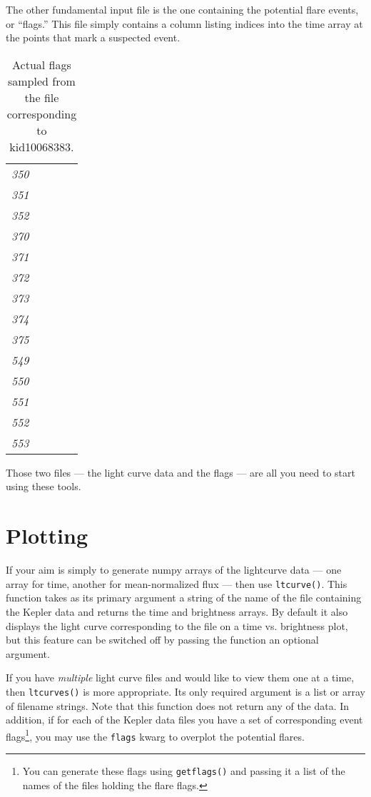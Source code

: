 \documentclass{article}
\begin{document}
The other fundamental input file is the one containing the potential
flare events, or ``flags.''  This file simply contains a column
listing indices into the time array at the points that mark a
suspected event.

\begin{table}[h]
  \centering
  \begin{tabular}{>{\itshape}p{0.2\linewidth}l}
         350 \\
         351 \\
         352 \\
         370 \\
         371 \\
         372 \\
         373 \\
         374 \\
         375 \\
         549 \\ 
         550 \\ 
         551 \\
         552 \\
         553 \\
\end{tabular}
\caption{Actual flags sampled from the file corresponding to
  kid10068383.}
\end{table}

Those two files --- the light curve data and the flags --- are all you
need to start using these tools.


\section{Plotting}
\label{sec:basic}

If your aim is simply to generate numpy arrays of the lightcurve data
--- one array for time, another for mean-normalized flux --- then use
\verb|ltcurve()|.  This function takes as its primary argument a
string of the name of the file containing the Kepler data and returns
the time and brightness arrays.  By default it also displays the light
curve corresponding to the file on a time vs. brightness plot, but
this feature can be switched off by passing the function an optional
argument.

If you have \emph{multiple} light curve files and would like to view
them one at a time, then \verb|ltcurves()| is more appropriate.  Its
only required argument is a list or array of filename strings.  Note
that this function does not return any of the data.  In addition, if
for each of the Kepler data files you have a set of corresponding
event flags\footnote{You can generate these flags using
  \texttt{getflags()} and passing it a list of the names of the files
  holding the flare flags.}, you may use the \verb|flags| kwarg to
overplot the potential flares.
\end{document}
